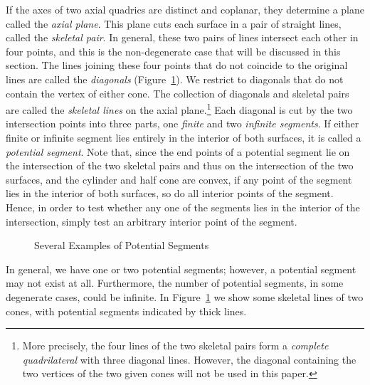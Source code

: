      If the axes of two axial quadrics are distinct and coplanar,
they determine a plane called the {\em axial plane}.  
This plane cuts each surface in a pair of straight lines, called the 
{\em skeletal pair}.  In general, these two 
pairs of lines intersect each other in four points, and this is the 
non-degenerate case that will be discussed in this section.  The lines joining
these four points that do not coincide to the original lines are called the 
{\em diagonals} (Figure~\ref{fig:potential-seg}).  We restrict to diagonals
that do not contain the vertex of either cone.
The collection of diagonals and skeletal pairs are called the
{\em skeletal lines} on the axial plane.\footnote{More precisely, the four
lines of the two skeletal pairs form a {\em complete quadrilateral} with 
three diagonal lines.  However, the diagonal containing the
two vertices of the two given cones will not be used in this paper.}  
Each diagonal is cut by the
two intersection points into three parts, one {\em finite} and two 
{\em infinite segments}.  If either finite or infinite segment lies entirely 
in the interior of both surfaces, it is called a {\em potential segment}.  
Note that, since the end points of a potential segment lie on the intersection 
of the two skeletal pairs and thus on the intersection of the two surfaces, 
and the cylinder and half cone are convex, if any point of the segment lies 
in the interior of both surfaces, so do all interior points of the segment.  
Hence, in order to test whether any one of the segments lies in the interior 
of the intersection, simply test an arbitrary interior point of the segment.

\begin{figure}
\vspace{7cm}
\caption{Several Examples of Potential Segments}
\label{fig:potential-seg}
\end{figure}

     In general, we have one or two potential segments; however, a potential
segment may not exist at all.  Furthermore, the number of potential segments,
in some degenerate cases, could be infinite.   
In Figure~\ref{fig:potential-seg} we show some skeletal lines of two cones,
with potential segments indicated by thick lines.


